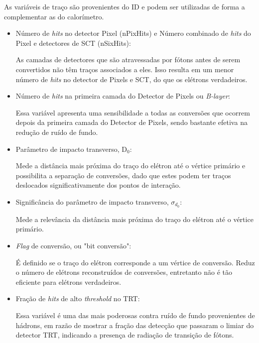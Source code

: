 As variáveis de traço são provenientes do ID e podem ser utilizadas de forma a complementar as do calorímetro.
	
\begin{itemize}
  \item Número de \emph{hits} no detector Pixel (nPixHits) e Número combinado de \emph{hits} do Pixel e detectores de SCT (nSixHits):

      As camadas de detectores que são atravessadas por fótons antes de serem convertidos não têm traços associados a eles. Isso resulta em um menor número de \emph{hits} no detector de Pixels e SCT, do que os elétrons verdadeiros.

  \item Número de \emph{hits} na primeira camada do Detector de Pixels ou \emph{B-layer}:

  Essa variável apresenta uma sensibilidade a todas as conversões que ocorrem depois da primeira camada do Detector de Pixels, sendo bastante efetiva na redução de ruído de fundo.

  \item Parâmetro de impacto transverso, D${_0}$:

  Mede a distância mais próxima do traço do elétron até o vértice primário e possibilita a separação de conversões, dado que estes podem ter traços deslocados significativamente dos pontos de interação.

  \item Significância do parâmetro de impacto transverso, ${\sigma _{{d_0}}}$:

  Mede a relevância da distância mais próxima do traço do elétron até o vértice primário.

  \item \emph{Flag} de conversão, ou "bit conversão":

  É definido se o traço do elétron corresponde a um vértice de conversão. Reduz o número de elétrons reconstruídos de conversões, entretanto não é tão eficiente para elétrons verdadeiros.

  \item Fração de \emph{hits} de alto \emph{threshold} no TRT:

  Essa variável é uma das mais poderosas contra ruído de fundo provenientes de hádrons, em razão de mostrar a fração das detecção que passaram o limiar do detector TRT, indicando a presença de radiação de transição de fótons.

\end{itemize}

